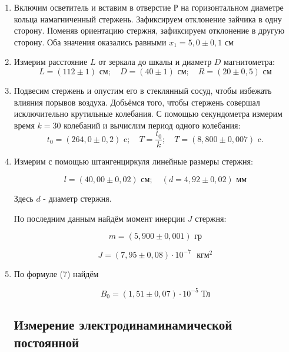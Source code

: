 \documentclass[a4paper,12pt]{article} %
\begin{document}
\begin{enumerate}
\item Включим осветитель и вставим в отверстие Р на горизонтальном диаметре кольца намагниченный стержень. Зафиксируем отклонение зайчика в одну сторону. Поменяв ориентацию стержня, зафиксируем отклонение в другую сторону. Оба значения оказались равными $x_{1} = 5,0\pm0,1$ см
\item Измерим расстояние $L$ от зеркала до шкалы и диаметр $D$ магнитометра:
  $$L = (112\pm1) \text{ см};\quad D = (40\pm1) \text{ см};\quad R = (20\pm0,5) \text{ см}$$
\item Подвесим стержень и опустим его в стеклянный сосуд, чтобы избежать влияния порывов воздуха. Добьёмся того, чтобы стержень совершал исключительно крутильные колебания.
  С помощью секундометра измерим время $k = 30$ колебаний и вычислим период одного колебания:
  \begin{equation*}
    t_{0} = (264,0\pm0,2)\text{ c} ;\quad T = \frac{t_{0}}{k} ;\quad T =(8,800\pm0,007)\text{ c}.
  \end{equation*}
\item Измерим с помощью штангенциркуля линейные размеры стержня:

  \begin{equation*}
    l = (40,00\pm0,02) \text{ см} ;\quad (d = 4,92\pm0,02) \text{ мм}
  \end{equation*}

  Здесь $d$ - диаметр стержня.

  По последним данным найдём момент инерции $J$ стержня:

  \begin{equation*}
    m = (5,900\pm0,001) \text{ гр} 
  \end{equation*}

  \begin{equation*}   
    J = (7,95 \pm 0,08) \cdot 10^{-7} \text{ }кгм^2
  \end{equation*}    

  
\item По формуле (7) найдём
  
  \begin{equation*}
    B_{0} = (1,51\pm0,07)\cdot10^{-5}\text{ Тл}
  \end{equation*}


  \subsection{Измерение электродинаминамической постоянной}


\end{enumerate}
\end{document}

